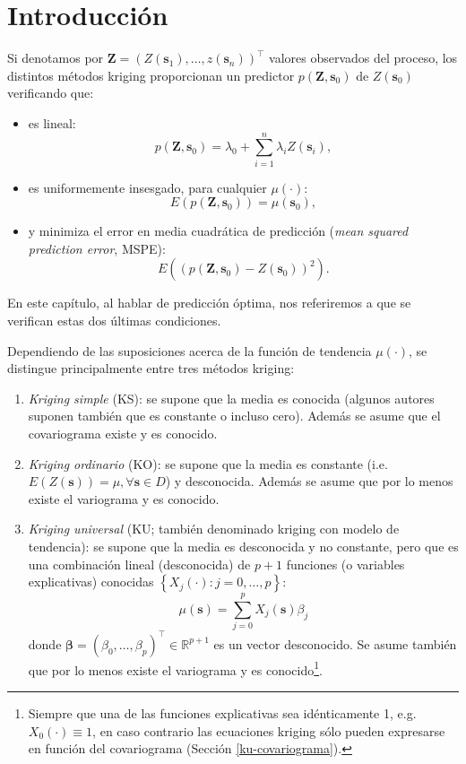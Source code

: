\documentclass[
  spanish,
]{book}
\theoremstyle{break}
\theoremstyle{definition}
\theoremstyle{definition}
\theoremstyle{definition}
\theoremstyle{definition}
\theoremstyle{remark}
\begin{document}
\hypertarget{introduccion}{%
\section{Introducción}\label{introduccion}}

Si denotamos por \(\mathbf{Z}=\left( Z(\mathbf{s}_{1}), \ldots, z(\mathbf{s}_{n} )\right)^\top\) valores observados del proceso, los distintos métodos kriging proporcionan un predictor \(p(\mathbf{Z},\mathbf{s}_{0})\) de \(Z(\mathbf{s}_{0})\) verificando que:

\begin{itemize}
\item
  es lineal:
  \[p(\mathbf{Z},\mathbf{s}_{0}) = \lambda_{0} + \sum\limits_{i=1}^{n}\lambda_{i} Z(\mathbf{s}_{i}),\]
\item
  es uniformemente insesgado, para cualquier \(\mu(\cdot)\):
  \[E(p(\mathbf{Z},\mathbf{s}_{0}))=\mu(\mathbf{s}_{0}),\]
\item
  y minimiza el error en media cuadrática de predicción (\emph{mean squared prediction error}, MSPE):
  \[E\left( \left( p(\mathbf{Z},\mathbf{s}_{0})-Z(\mathbf{s}_{0})\right)^2 \right).\]
\end{itemize}

En este capítulo, al hablar de predicción óptima, nos referiremos a que se verifican estas dos últimas condiciones.

Dependiendo de las suposiciones acerca de la función de tendencia \(\mu(\cdot)\), se distingue principalmente entre tres métodos kriging:

\begin{enumerate}
\def\labelenumi{\arabic{enumi}.}
\item
  \emph{Kriging simple} (KS): se supone que la media es conocida (algunos autores suponen también que es constante o incluso cero).
  Además se asume que el covariograma existe y es conocido.
\item
  \emph{Kriging ordinario} (KO): se supone que la media es constante (i.e.~\(E(Z(\mathbf{s}))=\mu ,\forall \mathbf{s}\in D\)) y desconocida.
  Además se asume que por lo menos existe el variograma y es conocido.
\item
  \emph{Kriging universal} (KU; también denominado kriging con modelo de tendencia): se supone que la media es desconocida y no constante, pero
  que es una combinación lineal (desconocida) de \(p+1\) funciones (o variables explicativas) conocidas \(\left\{ X_{j} (\cdot):j=0, \ldots,p\right\}\):
  \[\mu(\mathbf{s})=\sum\limits_{j=0}^{p}X_{j} (\mathbf{s})\beta_{j}\]
  donde \(\boldsymbol{\beta}=(\beta_{0}, \ldots, \beta_{p} )^\top \in \mathbb{R}^{p+1}\) es un vector desconocido.
  Se asume también que por lo menos existe el variograma y es conocido\footnote{Siempre que una de las funciones explicativas sea idénticamente 1, e.g.~\(X_{0} (\cdot)\equiv 1\), en caso contrario las ecuaciones kriging sólo pueden expresarse en función del covariograma (Sección \ref{ku-covariograma}).}.
\end{enumerate}
\end{document}
